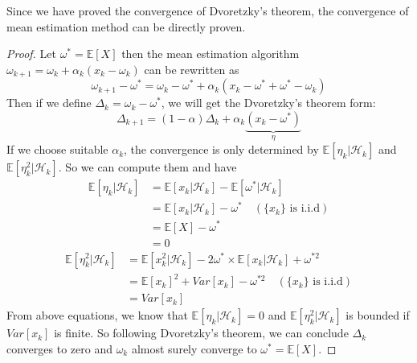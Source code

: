     Since we have proved the convergence of Dvoretzky's theorem, the convergence of mean estimation method can be directly
    proven.
    \begin{proof}
      Let $\omega^{*}=\mathbb{E}[X]$ then the mean estimation algorithm
      $\omega_{k+1}=\omega_{k}+\alpha_{k}(x_{k}-\omega_{k})$ can be rewritten as
      \begin{equation*}
        \omega_{k+1}-\omega^{*} = \omega_{k}-\omega^{*} +\alpha_{k}(x_{k} - \omega^{*} + \omega^{*} -\omega_{k})
      \end{equation*}
      Then if we define $\Delta_k=\omega_{k} - \omega^{*}$, we will get the Dvoretzky's theorem form:
      \begin{equation*}
        \Delta_{k+1} = (1-\alpha)\Delta_{k} + \alpha_{k}\underbrace{(x_{k}-\omega^{*})}_{\eta}
      \end{equation*}
      If we choose suitable $\alpha_{k}$, the convergence is only determined by $\mathbb{E}[\eta_{k}|\mathcal{H}_{k}]$ and
      $\mathbb{E}[\eta_{k}^{2}|\mathcal{H}_{k}]$. So we can compute them and have
      \begin{align*}
        \mathbb{E}[\eta_{k}|\mathcal{H}_{k}] & = \mathbb{E}[x_{k}|\mathcal{H}_{k}] - \mathbb{E}[\omega^{*}|\mathcal{H}_{k}]        \\
                                             & = \mathbb{E}[x_{k}|\mathcal{H}_{k}] - \omega^{*} \quad (\{x_{k}\} \text{ is i.i.d}) \\
                                             & = \mathbb{E}[X] - \omega^{*}                                                        \\
                                             & = 0
      \end{align*}
      \begin{align*}
        \mathbb{E}[\eta_{k}^{2}|\mathcal{H}_{k}] & = \mathbb{E}[x_{k}^{2}|\mathcal{H}_{k}] - 2\omega^{*}\times \mathbb{E}[x_{k}|\mathcal{H}_{k}]+\omega^{*2} \\
                                                 & = \mathbb{E}[x_{k}]^{2} + Var[x_{k}] - \omega^{*2} \quad (\{x_{k}\} \text{ is i.i.d})                     \\
                                                 & = Var[x_{k}]
      \end{align*}
      From above equations, we know that $\mathbb{E}[\eta_{k}|\mathcal{H}_{k}]=0$ and
      $\mathbb{E}[\eta_{k}^{2}|\mathcal{H}_{k}] $ is bounded if $Var[x_{k}]$ is finite. So following Dvoretzky's theorem, we
      can conclude $\Delta_{k}$ converges to zero and $\omega_{k}$ almost surely converge to $\omega^{*}=\mathbb{E}[X]$.
    \end{proof}

